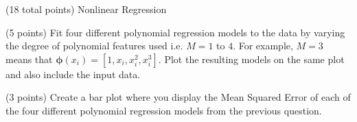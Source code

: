 \documentclass[12pt]{article}
\begin{document}
\begin{question}{(18 total points) Nonlinear Regression}





%
%
\begin{subquestion}{(5 points) Fit four different polynomial regression models to the data  by varying the degree of polynomial features used i.e. $M = 1$ to $4$.
For example, $M=3$ means that $\boldsymbol{\phi}(x_i) = [1, x_i, x_i^2, x_i^3]$.
Plot the resulting models on the same plot and also include the input data.\\
}





\end{subquestion}


%
%
\begin{subquestion}{(3 points) Create a bar plot where you display the Mean Squared Error of each of the four different polynomial regression models from the previous question.}






\end{subquestion}
\end{question}
\end{document}
